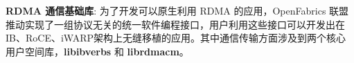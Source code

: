 {\textbf{RDMA 通信基础库}: 为了开发可以原生利用 RDMA 的应用，OpenFabrics 联盟推动实现了一组协议无关的统一软件编程接口，用户利用这些接口可以开发出在 IB、RoCE、iWARP架构上无缝移植的应用。其中通信传输方面涉及到两个核心用户空间库，\textbf{libibverbs} 和 \textbf{librdmacm}。
}
